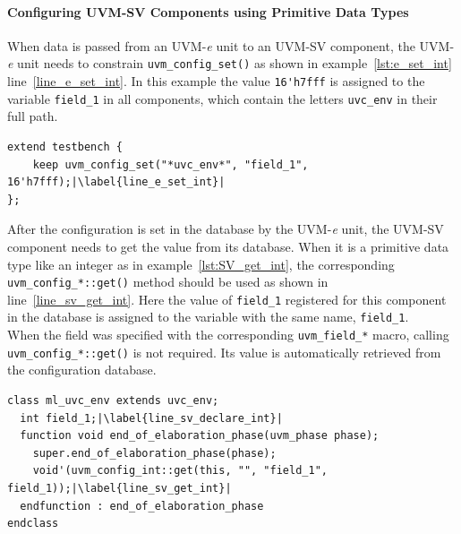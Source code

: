 \paragraph{Configuring UVM-SV Components using Primitive Data Types}\label{config_sv_primitive}

When data is passed from an UVM-\textit{e} unit to an UVM-SV component,
the UVM-\textit{e} unit needs to constrain \lstinline$uvm_config_set()$ as shown in example~\ref{lst:e_set_int}
line~\ref{line_e_set_int}. In this example the value \lstinline$16'h7fff$ is assigned to the variable
\lstinline$field_1$ in all components, which contain the letters \lstinline$uvc_env$ in their full path.

\lstset{language=e, numbers = left, escapechar=|, breaklines=true}
\begin{lstlisting}[frame=htrbl, caption={\textit{e}: register an integer in configuration database},
label={lst:e_set_int}]
extend testbench {
    keep uvm_config_set("*uvc_env*", "field_1", 16'h7fff);|\label{line_e_set_int}|
};
\end{lstlisting}

After the configuration is set in the database by the UVM-\textit{e} unit, the UVM-SV component needs to get
the value from its database. When it is a primitive data type like an integer as in example~\ref{lst:SV_get_int},
the corresponding \lstinline$uvm_config_*::get()$ method should be used as shown in line~\ref{line_sv_get_int}. Here the
value of \lstinline$field_1$ registered for this component in the database is assigned to the variable with the same
name, \lstinline$field_1$.\\
When the field was specified with the corresponding \lstinline$uvm_field_*$ macro, calling
\lstinline$uvm_config_*::get()$ is not required. Its value is automatically retrieved from the configuration database.

\lstset{language=SystemVerilog, numbers = left, escapechar=|, breaklines=true}
\begin{lstlisting}[frame=htrbl, caption={SystemVerilog: getting an integer from configuration database},
label={lst:SV_get_int}]
class ml_uvc_env extends uvc_env;
  int field_1;|\label{line_sv_declare_int}|
  function void end_of_elaboration_phase(uvm_phase phase);
  	super.end_of_elaboration_phase(phase);
    void'(uvm_config_int::get(this, "", "field_1", field_1));|\label{line_sv_get_int}|
  endfunction : end_of_elaboration_phase
endclass
\end{lstlisting}

